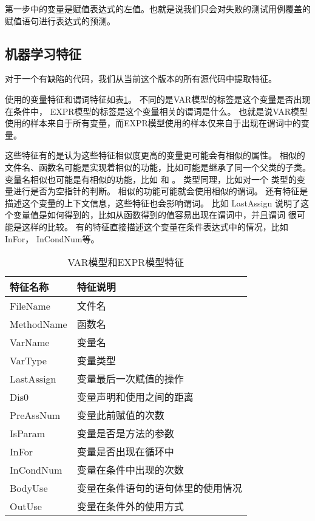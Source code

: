 第一步中的变量是赋值表达式的左值。也就是说我们只会对失败的测试用例覆盖的赋值语句进行表达式的预测。

\subsection{机器学习特征}

对于一个有缺陷的代码，我们从当前这个版本的所有源代码中提取特征。

使用的变量特征和谓词特征如表\ref{var_feature}。
不同的是VAR模型的标签是这个变量是否出现在条件中，
EXPR模型的标签是这个变量相关的谓词是什么。
也就是说VAR模型使用的样本来自于所有变量，而EXPR模型使用的样本仅来自于出现在谓词中的变量。

这些特征有的是认为这些特征相似度更高的变量更可能会有相似的属性。
相似的文件名、函数名可能是实现着相似的功能，比如可能是继承了同一个父类的子类。
变量名相似也可能是有相似的功能，比如  和 。
类型同理，比如对一个  类型的变量进行是否为空指针的判断。
相似的功能可能就会使用相似的谓词。
还有特征是描述这个变量的上下文信息，这些特征也会影响谓词。
比如 LastAssign 说明了这个变量值是如何得到的，比如从函数得到的值容易出现在谓词中，并且谓词
很可能是这样的比较。
有的特征直接描述这个变量在条件表达式中的情况，比如 InFor， InCondNum等。


\begin{table}
\centering
\begin{tabular}{|l|l|}
\hline
特征名称 & 特征说明 \\
\hline
FileName & 文件名 \\
\hline
MethodName & 函数名 \\
\hline
VarName & 变量名 \\
\hline
VarType & 变量类型 \\
\hline
LastAssign & 变量最后一次赋值的操作 \\
\hline
Dis0 & 变量声明和使用之间的距离 \\
\hline
PreAssNum & 变量此前赋值的次数 \\
\hline
IsParam & 变量是否是方法的参数 \\
\hline
InFor & 变量是否出现在循环中 \\
\hline
InCondNum & 变量在条件中出现的次数 \\
\hline
BodyUse & 变量在条件语句的语句体里的使用情况 \\
\hline
OutUse & 变量在条件外的使用方式 \\
\hline
\end{tabular}
\caption{VAR模型和EXPR模型特征}
\label{var_feature}
\end{table}

